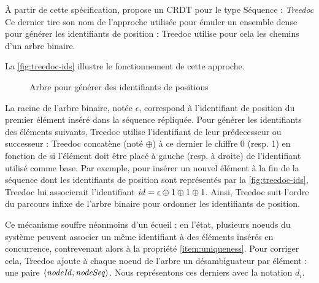 À partir de cette spécification, \citeauthor{2009-treedoc-preguica} propose un CRDT pour le type Séquence : \emph{Treedoc}
Ce dernier tire son nom de l'approche utilisée pour émuler un ensemble dense pour générer les identifiants de position : Treedoc utilise pour cela les chemins d'un arbre binaire.

La \autoref{fig:treedoc-ids} illustre le fonctionnement de cette approche.
\begin{figure}[!ht]

  \centering
  \caption{Arbre pour générer des identifiants de positions}
  \label{fig:treedoc-ids}
\end{figure}
La racine de l'arbre binaire, notée $\epsilon$, correspond à l'identifiant de position du premier élément inséré dans la séquence répliquée.
Pour générer les identifiants des éléments suivants, Treedoc utilise l'identifiant de leur prédecesseur ou successeur : Treedoc concatène (noté $\oplus$) à ce dernier le chiffre 0 (resp. 1) en fonction de si l'élément doit être placé à gauche (resp. à droite) de l'identifiant utilisé comme base.
Par exemple, pour insérer un nouvel élément à la fin de la séquence dont les identifiants de position sont représentés par la \autoref{fig:treedoc-ids}, Treedoc lui associerait l'identifiant $\mathit{id} = \epsilon \oplus 1 \oplus 1 \oplus 1$.
Ainsi, Treedoc suit l'ordre du parcours infixe de l'arbre binaire pour ordonner les identifiants de position.

Ce mécanisme souffre néanmoins d'un écueil : en l'état, plusieurs noeuds du système peuvent associer un même identifiant à des éléments insérés en concurrence, contrevenant alors à la propriété \ref{item:uniqueness}.
Pour corriger cela, Treedoc ajoute à chaque noeud de l'arbre un désambiguateur par élément : une paire $\langle \mathit{nodeId},\mathit{nodeSeq} \rangle$.
Nous représentons ces derniers avec la notation $d_i$.

